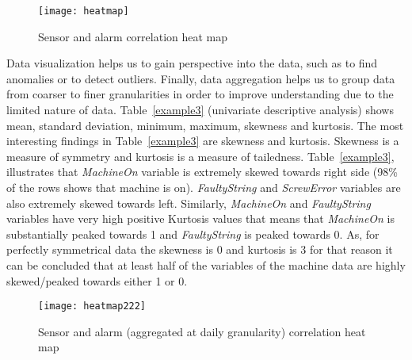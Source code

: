 \documentclass[runningheads]{llncs}
\begin{document}
 \begin{figure}
\centering
    \texttt{[image: heatmap]}
  \caption{Sensor and alarm correlation heat map}
  \label{fig:correlation1}
\end{figure}

Data visualization helps us to gain perspective into the data, such as to find anomalies or to detect outliers. Finally, data aggregation helps us to group data from coarser to finer granularities in order to improve understanding due to the limited nature of data. Table~\ref{example3} (univariate descriptive analysis) shows mean, standard deviation, minimum, maximum, skewness and kurtosis. The most interesting findings in Table~\ref{example3} are skewness and kurtosis. Skewness is a measure of symmetry and kurtosis is a measure of  tailedness. Table~\ref{example3}, illustrates that \emph{MachineOn} variable is extremely skewed towards right side (98\% of the rows shows that machine is on). \emph{FaultyString} and \emph{ScrewError} variables are also extremely skewed towards left. Similarly, \emph{MachineOn} and \emph{FaultyString} variables have very high positive Kurtosis values that means that \emph{MachineOn} is substantially peaked towards 1 and \emph{FaultyString} is peaked towards 0. As, for perfectly symmetrical data the skewness is 0 and kurtosis is 3 for that reason it can be concluded that at least half of the variables of the machine data  are highly skewed/peaked towards either 1 or 0.

\begin{figure}
\centering
    \texttt{[image: heatmap222]}
  \caption{Sensor and alarm (aggregated at daily granularity) correlation heat map \cite{nadeem}}
  \label{fig:correlation2}
\end{figure}
\end{document}
